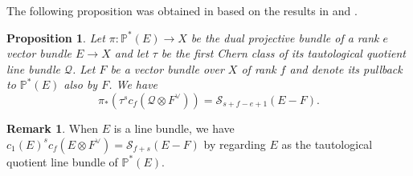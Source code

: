 \documentclass[12pt, reqno,sumlimits]{amsart}
\newtheorem{prop}[thm]{Proposition}
\theoremstyle{definition}
\newtheorem{rem}[thm]{Remark}
\numberwithin{equation}{section}
\newcommand{\PP}{{\mathbb P}}
\newcommand{\calQ}{{\mathcal Q}}
\newcommand{\scS}{{\mathscr S}}
\begin{document}
The following proposition was obtained in \cite{HIMN} based on the results in  \cite{BuchQuiver} and \cite{Vishik}.
\begin{prop}\label{push of tensor} 
Let $\pi: \PP^*(E)\rightarrow X$ be the dual projective bundle of a rank $e$ vector bundle $E\to X$ and let $\tau$ be the first Chern class of its tautological quotient line bundle $\calQ$. Let $F$ be a vector bundle over $X$ of rank $f$ and denote its pullback to $\PP^*(E)$ also by $F$. We have 
\[
\pi_*\left(\tau^sc_f(\calQ \otimes F^{\vee})\right) = \scS_{s+f-e+1}(E-F).
\]
\end{prop}
\begin{rem}\label{remLine}
When $E$ is a line bundle, we have $c_1(E)^sc_{f}(E \otimes F^{\vee}) = \scS_{f+s}(E-F)$ by regarding $E$ as the tautological quotient line bundle of $\PP^*(E)$.
\end{rem}
\end{document}
